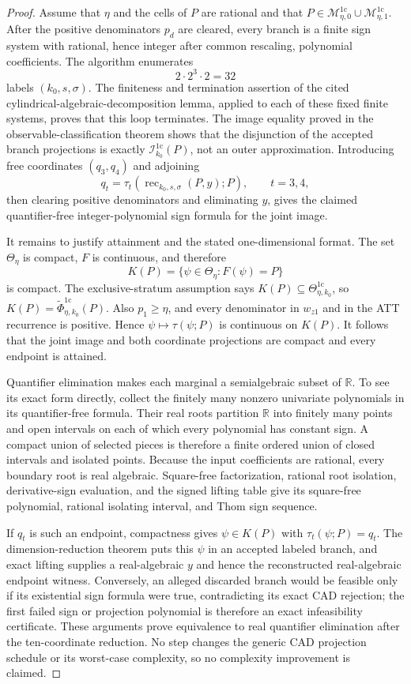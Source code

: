 \documentclass{article}
\begin{document}
\begin{proof}
Assume that \(\eta\) and the cells of \(P\) are rational and that \(P\in\mathcal M_{\eta,0}^{1\mathrm c}\cup\mathcal M_{\eta,1}^{1\mathrm c}\).  After the positive denominators \(p_d\) are cleared, every branch is a finite sign system with rational, hence integer after common rescaling, polynomial coefficients.  The algorithm enumerates
\[
 2\cdot 2^3\cdot 2=32
\]
labels \((k_0,s,\sigma)\).  The finiteness and termination assertion of the cited cylindrical-algebraic-decomposition lemma, applied to each of these fixed finite systems, proves that this loop terminates.  The image equality proved in the observable-classification theorem shows that the disjunction of the accepted branch projections is exactly \(\mathcal I_{k_0}^{1\mathrm c}(P)\), not an outer approximation.  Introducing free coordinates \((q_3,q_4)\) and adjoining
\[
 q_t=\tau_t(\operatorname{rec}_{k_0,s,\sigma}(P,y);P),\qquad t=3,4,
\]
then clearing positive denominators and eliminating \(y\), gives the claimed quantifier-free integer-polynomial sign formula for the joint image.

It remains to justify attainment and the stated one-dimensional format.  The set \(\Theta_\eta\) is compact, \(F\) is continuous, and therefore
\[
 K(P)=\{\psi\in\Theta_\eta:F(\psi)=P\}
\]
is compact.  The exclusive-stratum assumption says \(K(P)\subseteq\Theta_{\eta,k_0}^{1\mathrm c}\), so \(K(P)=\widetilde\Phi_{\eta,k_0}^{1\mathrm c}(P)\).  Also \(p_1\geq\eta\), and every denominator in \(w_{z1}\) and in the ATT recurrence is positive.  Hence \(\psi\mapsto\tau(\psi;P)\) is continuous on \(K(P)\).  It follows that the joint image and both coordinate projections are compact and every endpoint is attained.

Quantifier elimination makes each marginal a semialgebraic subset of \(\mathbb R\).  To see its exact form directly, collect the finitely many nonzero univariate polynomials in its quantifier-free formula.  Their real roots partition \(\mathbb R\) into finitely many points and open intervals on each of which every polynomial has constant sign.  A compact union of selected pieces is therefore a finite ordered union of closed intervals and isolated points.  Because the input coefficients are rational, every boundary root is real algebraic.  Square-free factorization, rational root isolation, derivative-sign evaluation, and the signed lifting table give its square-free polynomial, rational isolating interval, and Thom sign sequence.

If \(q_t\) is such an endpoint, compactness gives \(\psi\in K(P)\) with \(\tau_t(\psi;P)=q_t\).  The dimension-reduction theorem puts this \(\psi\) in an accepted labeled branch, and exact lifting supplies a real-algebraic \(y\) and hence the reconstructed real-algebraic endpoint witness.  Conversely, an alleged discarded branch would be feasible only if its existential sign formula were true, contradicting its exact CAD rejection; the first failed sign or projection polynomial is therefore an exact infeasibility certificate.  These arguments prove equivalence to real quantifier elimination after the ten-coordinate reduction.  No step changes the generic CAD projection schedule or its worst-case complexity, so no complexity improvement is claimed.
\end{proof}
\end{document}
